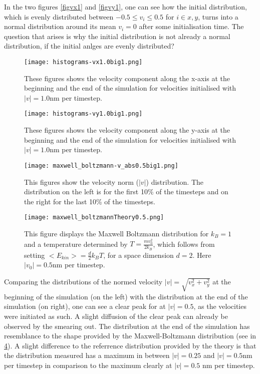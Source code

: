 \documentclass{article}
\begin{document}
In the two figures \ref{figvx1} and \ref{figvy1}, one can see how the initial distribution, which is evenly distributed between $-0.5\leq v_i \leq 0.5$ for $i\in {x,y}$, turns into a normal distribution around its mean $v_i=0$ after some initialisation time. The question that arises is why the initial distribution is not already a normal distribution, if the initial anlges are evenly distributed? 


\begin{figure}[h]
    \centering
    \texttt{[image: histograms-vx1.0big1.png]}
    \caption{These figures shows the velocity component along the x-axis at the beginning and the end of the simulation for velocities initialised with $|v|=1.0$nm per timestep.}
    \label{figvx2}
\end{figure}

\begin{figure}[h!]
    \centering
    \texttt{[image: histograms-vy1.0big1.png]}
    \caption{These figures shows the velocity component along the y-axis at the beginning and the end of the simulation for velocities initialised with $|v|=1.0$nm per timestep.}
    \label{figvy2}
\end{figure}


\begin{figure}[h]
    \centering
    \texttt{[image: maxwell\_boltzmann-v\_abs0.5big1.png]}
    \caption{This figures show the velocity norm ($|v|$) distribution. The distribution on the left is for the first 10\% of the timesteps and on the right for the last 10\% of the timesteps.}
    \label{vabs05}
\end{figure}

\begin{figure}[h!]
    \centering
    \texttt{[image: maxwell\_boltzmannTheory0.5.png]}
    \caption{This figure displays the Maxwell Boltzmann distribution for $k_B=1$ and a temperature determined by $T=\frac{m v_0^2}{2k_B}$, which follows from setting $<E_{kin}> =\frac{d}{2}k_BT$, for a space dimension $d=2$. Here $|v_0|=0.5$nm per timestep.}
    \label{mwbolts05}
\end{figure}

Comparing the distributions of the normed velocity $|v|=\sqrt{v_x^2+v_y^2}$ at the beginning of the simulation (on the left) with the distribution at the end of the simulation (on right), one can see a clear peak for at $|v|=0.5$, as the velocities were initiated as such. A slight diffusion of the clear peak can already be observed by the smearing out. The distribution at the end of the simulation has resemblance to the shape provided by the Maxwell-Boltzmann distribution (see in \ref{mwbolts05}). A slight difference to the referrence distribution provided by the theory is that the distribution measured has a maximum in between $|v|=0.25$ and $|v|=0.5$nm per timestep in comparison to the maximum clearly at $|v|=0.5$ nm per timestep.
\end{document}
